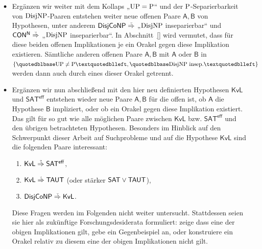 \begin{itemize}[parsep=0pt,listparindent=\parindent,itemsep=5pt plus 1pt minus 1pt,midpenalty=0]
    \item Ergänzen wir weiter mit dem Kollaps „$\UP=\P$“ und der $\P$-Separierbarkeit von $\DisjNP$-Paaren entstehen weiter neue offenen Paare $\mathsf{A,B}$ von Hypothesen, unter anderem $\hDisjCoNP\stackrel{\smash{\text{\raisebox{-1pt}{\tiny ?}}}}{\Rightarrow}$ „$\DisjNP$ inseparierbar“ und $\mathsf{CON^N}\stackrel{\smash{\text{\raisebox{-1pt}{\tiny ?}}}}{\Rightarrow}$ „$\DisjNP$ inseparierbar“. In Abschnitt~\ref{} wird vermutet, dass für diese beiden offenen Implikationen je ein Orakel gegen diese Implikation existieren. Sämtliche anderen offenen Paare $\mathsf{A,B}$ mit $\mathsf{A}$ oder $\mathsf{B}$ in $\{„\UP\neq\P“, „\DisjNP\text{ insep.}“\}$ werden dann auch durch eines dieser Orakel getrennt.

    \item Ergänzen wir nun abschließend mit den hier neu definierten Hypothesen $\mathsf{KvL}$ und $\mathsf{SAT^{eff}}$ entstehen wieder neue Paare $\mathsf{A,B}$ für die offen ist, ob $\mathsf A$ die Hypothese $\mathsf B$ impliziert, oder ob ein Orakel gegen diese Implikation existiert. Das gilt für so gut wie alle möglichen Paare zwischen $\mathsf{KvL}$ bzw. $\mathsf{SAT^{eff}}$ und den übrigen betrachteten Hypothesen. 
        Besonders im Hinblick auf den Schwerpunkt dieser Arbeit auf Suchprobleme und auf die Hypothese $\mathsf{KvL}$ sind die folgenden Paare interessant:
        \begin{enumerate}[nosep]
            \item $\mathsf{KvL}\stackrel{\smash{\text{\raisebox{-1pt}{\tiny ?}}}}{\Rightarrow}\mathsf{SAT^{eff}}$,
            \item $\mathsf{KvL}\stackrel{\smash{\text{\raisebox{-1pt}{\tiny ?}}}}{\Rightarrow}\hTAUT$ (oder stärker $\hSAT\lor\hTAUT$),
            \item $\hDisjCoNP\stackrel{\smash{\text{\raisebox{-1pt}{\tiny ?}}}}{\Rightarrow}\mathsf{KvL}$.
        \end{enumerate}
        Diese Fragen werden im Folgenden nicht weiter untersucht. Stattdessen seien sie hier als zukünftige Forschungsdesiderata formuliert: zeige dass eine der obigen Implikationen gilt, gebe ein Gegenbeispiel an, oder konstruiere ein Orakel relativ zu diesem eine der obigen Implikationen nicht gilt.
\end{itemize}


